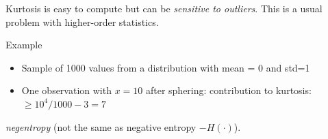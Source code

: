 \begin{frame}


Kurtosis is easy to compute but can be \emph{sensitive to outliers}. 
This is a usual problem with higher-order statistics. 
\begin{block}{Example}
\begin{itemize}
  \item Sample of 1000 values from a distribution with mean = 0 and std=1
  \item One observation with $x=10$ after sphering:
  \itl contribution to kurtosis: $ \geq 10^4/1000 -3 = 7$
\end{itemize}
\end{block}

\pause

\emph{negentropy} (not the same as negative entropy $-H(\cdot)$).\\


\end{frame}
